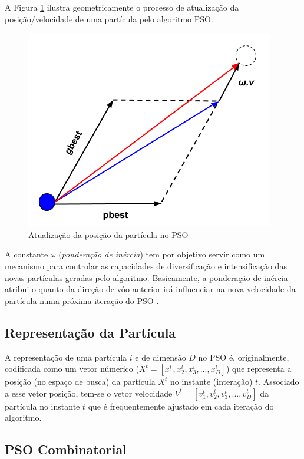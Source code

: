 \documentclass[
	12pt,				%
	openany,			%
	oneside,	
	a4paper,			%
	brazil,				%
	]{unimontes-ppgmsc-abntex2}
\begin{document}
A Figura \ref{fig:nova_part} ilustra geometricamente o processo de atualização da posição/velocidade de uma partícula pelo algoritmo PSO.

\begin{figure}[ht]
\label{fig:nova_part}
\centering
\includegraphics[scale=.5]{img/nova_part}
\caption{Atualização da posição da partícula no PSO}
\end{figure}

A constante $\omega$ ({\em ponderação de inércia}) tem por objetivo servir como um mecanismo para controlar as capacidades de diversificação e intensificação das novas partículas geradas pelo algoritmo. Basicamente, a ponderação de inércia atribui o quanto da direção de vôo anterior irá influenciar na nova velocidade da partícula numa próxima iteração do PSO \cite{Rini_2011}.

\subsection{Representação da Partícula}
\label{sec:repr_part}

A representação de uma partícula $i$ e de dimensão $D$ no PSO é, originalmente, codificada como um vetor númerico ($X^t =[x^t_1, x^t_2, x^t_3, ... ,x^t_D]$) que representa a posição (no espaço de busca) da partícula $X^t$ no instante (interação) $t$. Associado a esse vetor posição, tem-se o vetor velocidade $V^t =[v^t_1, v^t_2, v^t_3, ... , v^t_D]$ da partícula no instante $t$ que é frequentemente ajustado em cada iteração do algoritmo.

\subsection{PSO Combinatorial}
\label{sec:pso_discretos}
\end{document}
